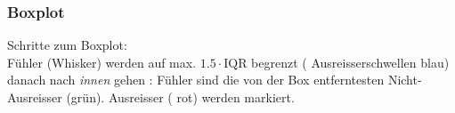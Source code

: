 \headerUndFooterJedeSeite{}
\newpage
\headerUndFooterJedeSeite{}
\subsubsection*{Boxplot}
Schritte zum Boxplot:\\
Fühler (Whisker) werden auf max. $1.5\cdot\textrm{IQR}$ begrenzt ({\color{blue} Ausreisserschwellen blau})
\ifdefined\versionHECH%
danach nach \textit{\color{dunklesGruen}innen} gehen
\fi%
: Fühler sind die von der Box
entferntesten Nicht-Ausreisser ({\color{dunklesGruen}grün}). Ausreisser
({\color{red} rot}) werden markiert.

\hrulefill


